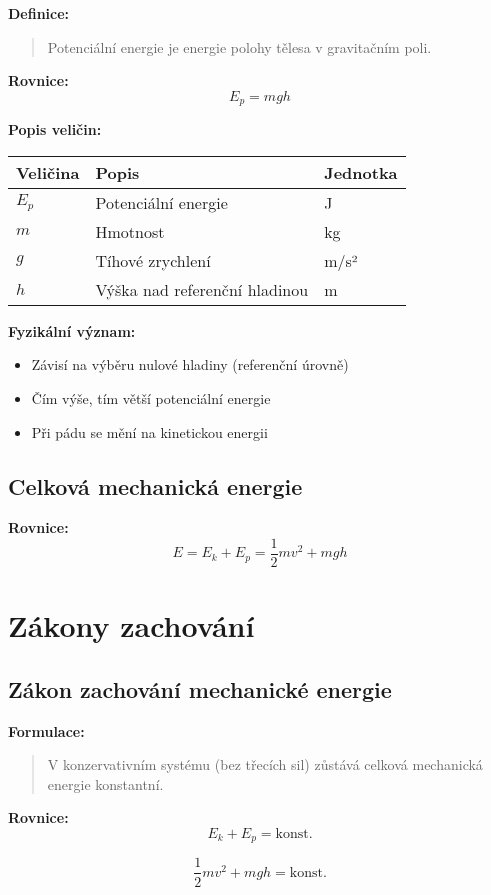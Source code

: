 \documentclass[11pt,a4paper]{article}
\begin{document}
\textbf{Definice:}
\begin{quote}
Potenciální energie je energie polohy tělesa v gravitačním poli.
\end{quote}

\textbf{Rovnice:}
\[E_p = mgh\]

\textbf{Popis veličin:}

\begin{longtable}{lll}
\toprule
Veličina & Popis & Jednotka \\
\midrule
$E_p$ & Potenciální energie & J \\
$m$ & Hmotnost & kg \\
$g$ & Tíhové zrychlení & m/s² \\
$h$ & Výška nad referenční hladinou & m \\
\bottomrule
\end{longtable}

\textbf{Fyzikální význam:}
\begin{itemize}
\item Závisí na výběru nulové hladiny (referenční úrovně)
\item Čím výše, tím větší potenciální energie
\item Při pádu se mění na kinetickou energii
\end{itemize}

\subsection{Celková mechanická energie}

\textbf{Rovnice:}
\[E = E_k + E_p = \frac{1}{2}mv^2 + mgh\]

\clearpage

\section{Zákony zachování}

\subsection{Zákon zachování mechanické energie}

\textbf{Formulace:}
\begin{quote}
V konzervativním systému (bez třecích sil) zůstává celková mechanická energie konstantní.
\end{quote}

\textbf{Rovnice:}
\[E_k + E_p = \text{konst.}\]

\[\frac{1}{2}mv^2 + mgh = \text{konst.}\]
\end{document}
